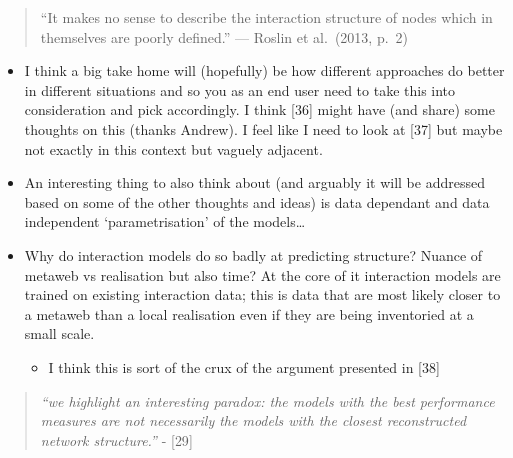 \documentclass[
]{article}
\providecommand{\tightlist}{%
  \setlength{\itemsep}{0pt}\setlength{\parskip}{0pt}}\usepackage{longtable,booktabs,array}
\begin{document}
\begin{quote}
``It makes no sense to describe the interaction structure of nodes which
in themselves are poorly defined.'' --- Roslin et al.~(2013, p.~2)
\end{quote}

\begin{itemize}
\item
  I think a big take home will (hopefully) be how different approaches
  do better in different situations and so you as an end user need to
  take this into consideration and pick accordingly. I think {[}36{]}
  might have (and share) some thoughts on this (thanks Andrew). I feel
  like I need to look at {[}37{]} but maybe not exactly in this context
  but vaguely adjacent.
\item
  An interesting thing to also think about (and arguably it will be
  addressed based on some of the other thoughts and ideas) is data
  dependant and data independent `parametrisation' of the models\ldots{}
\item
  Why do interaction models do so badly at predicting structure? Nuance
  of metaweb vs realisation but also time? At the core of it interaction
  models are trained on existing interaction data; this is data that are
  most likely closer to a metaweb than a local realisation even if they
  are being inventoried at a small scale.

  \begin{itemize}
  \tightlist
  \item
    I think this is sort of the crux of the argument presented in
    {[}38{]}
  \end{itemize}
\end{itemize}

\begin{quote}
\emph{``we highlight an interesting paradox: the models with the best
performance measures are not necessarily the models with the closest
reconstructed network structure.''} - {[}29{]}
\end{quote}
\end{document}
